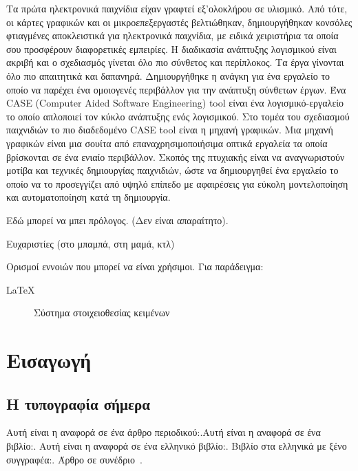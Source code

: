 \documentclass[oneside, 12pt]{book}
\begin{document}
	
	\Titlepage
	\Declarationpage
	
	\begin{Abstract}
		Τα πρώτα ηλεκτρονικά παιχνίδια είχαν γραφτεί εξ'ολοκλήρου σε υλισμικό. Από τότε, οι κάρτες γραφικών και οι μικροεπεξεργαστές βελτιώθηκαν, δημιουργήθηκαν κονσόλες φτιαγμένες αποκλειστικά για ηλεκτρονικά παιχνίδια, με ειδικά χειριστήρια τα οποία σου προσφέρουν διαφορετικές εμπειρίες.
		Η διαδικασία ανάπτυξης λογισμικού είναι ακριβή και ο σχεδιασμός γίνεται όλο πιο σύνθετος και περίπλοκος. Τα έργα γίνονται όλο πιο απαιτητικά και δαπανηρά. Δημιουργήθηκε η ανάγκη για ένα εργαλείο το οποίο να παρέχει ένα ομοιογενές περιβάλλον για την ανάπτυξη σύνθετων έργων. 
		Ένα CASE (Computer Aided Software Engineering) tool είναι ένα λογισμικό-εργαλείο το οποίο απλοποιεί τον κύκλο ανάπτυξης ενός λογισμικού. 
		Στο τομέα του σχεδιασμού παιχνιδιών το πιο διαδεδομένο CASE tool είναι η μηχανή γραφικών. Μια μηχανή γραφικών είναι μια σουίτα από επαναχρησιμοποιήσιμα οπτικά εργαλεία τα οποία βρίσκονται σε ένα ενιαίο περιβάλλον.
		Σκοπός της πτυχιακής είναι να αναγνωριστούν μοτίβα και τεχνικές δημιουργίας παιχνιδιών, ώστε να δημιουργηθεί ένα εργαλείο το οποίο να το προσεγγίζει από υψηλό επίπεδο με αφαιρέσεις για εύκολη μοντελοποίηση και αυτοματοποίηση κατά τη δημιουργία.
	\end{Abstract}
	\tableofcontents
	\listoftables
	\listoffigures
	
	\begin{Preface}
		Εδώ μπορεί να μπει πρόλογος. (Δεν είναι απαραίτητο).
	\end{Preface}
	
	\begin{Acknowledgement}
		Ευχαριστίες (στο μπαμπά, στη μαμά, κτλ)
	\end{Acknowledgement}
	
	\begin{Definitions}
		Ορισμοί εννοιών που μπορεί να είναι χρήσιμοι. Για παράδειγμα:	
		\begin{description}
			\item [\LaTeX] Σύστημα στοιχειοθεσίας κειμένων
		\end{description}
		
	\end{Definitions}
	
	\chapter{Εισαγωγή}
			
		\leftmark\rightmark
		\section{Η τυπογραφία σήμερα}
		Αυτή είναι η αναφορά σε ένα άρθρο περιοδικού:\citep{Schmidt98}.Αυτή
		είναι η αναφορά σε ένα βιβλίο:\citep{goosens93}. Αυτή είναι η αναφορά
		σε ένα ελληνικό βιβλίο:\citep{Chatzigeorgiou05}. Βιβλίο στα ελληνικά
		με ξένο συγγραφέα:\citep{Sommerville09}. Άρθρο σε
		συνέδριο~\citep{4343930}. 
		
\end{document}
